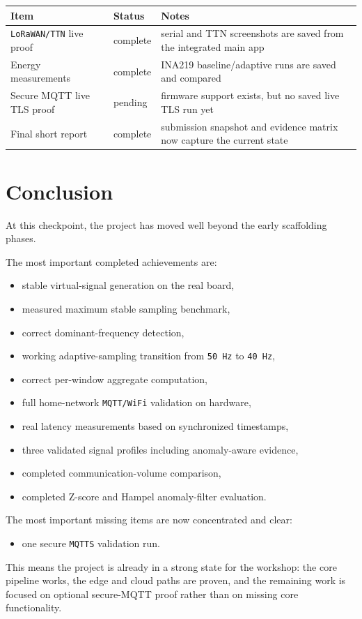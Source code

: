 \documentclass[12pt,a4paper]{article}
\begin{document}
\begin{center}
\begin{tabularx}{\textwidth}{|>{\raggedright\arraybackslash}p{}|>{\raggedright\arraybackslash}p{}|X|}
\hline
\textbf{Item} & \textbf{Status} & \textbf{Notes} \\
\hline
\texttt{LoRaWAN/TTN} live proof & complete & serial and TTN screenshots are saved from the integrated main app \\
\hline
Energy measurements & complete & INA219 baseline/adaptive runs are saved and compared \\
\hline
Secure MQTT live TLS proof & pending & firmware support exists, but no saved live TLS run yet \\
\hline
Final short report & complete & submission snapshot and evidence matrix now capture the current state \\
\hline
\end{tabularx}
\end{center}

\section{Conclusion}

At this checkpoint, the project has moved well beyond the early scaffolding
phases.

The most important completed achievements are:

\begin{itemize}
    \item stable virtual-signal generation on the real board,
    \item measured maximum stable sampling benchmark,
    \item correct dominant-frequency detection,
    \item working adaptive-sampling transition from \texttt{50 Hz} to \texttt{40 Hz},
    \item correct per-window aggregate computation,
    \item full home-network \texttt{MQTT/WiFi} validation on hardware,
    \item real latency measurements based on synchronized timestamps,
    \item three validated signal profiles including anomaly-aware evidence,
    \item completed communication-volume comparison,
    \item completed Z-score and Hampel anomaly-filter evaluation.
\end{itemize}

The most important missing items are now concentrated and clear:

\begin{itemize}
    \item one secure \texttt{MQTTS} validation run.
\end{itemize}

This means the project is already in a strong state for the workshop: the core
pipeline works, the edge and cloud paths are proven, and the remaining work is
focused on optional secure-MQTT proof rather than on missing core functionality.
\end{document}
